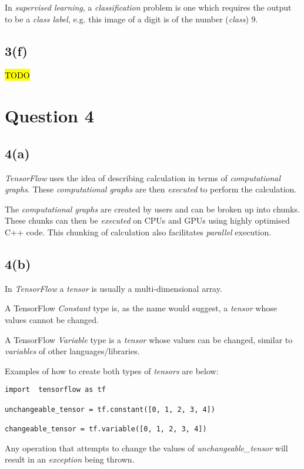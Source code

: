 \documentclass[12pt, a4paper,reqno]{article}
\begin{document}
In \emph{supervised learning}, a \emph{classification} problem is one which requires the output to be a \emph{class label}, e.g. this image of a digit is of the number (\emph{class}) 9.

\subsection*{3(f)}
\hl{TODO}


%
%
\clearpage\section*{Question 4}

\subsection*{4(a)}
\emph{TensorFlow} uses the idea of describing calculation in terms of \emph{computational graphs}. These \emph{computational graphs} are then \emph{executed} to perform the calculation. 

The \emph{computational graphs} are created by users and can be broken up into chunks. These chunks can then be \emph{executed} on CPUs and GPUs using highly optimised C++ code. This chunking of calculation also facilitates \emph{parallel} execution. 

\subsection*{4(b)}
In \emph{TensorFlow} a \emph{tensor} is usually a multi-dimensional array.

A TensorFlow \emph{Constant} type is, as the name would suggest, a \emph{tensor} whose values cannot be changed.

A TensorFlow \emph{Variable} type is a \emph{tensor} whose values can be changed, similar to \emph{variables} of other languages/libraries.

Examples of how to create both types of \emph{tensors} are below:

\begin{verbatim}
import  tensorflow as tf

unchangeable_tensor = tf.constant([0, 1, 2, 3, 4])

changeable_tensor = tf.variable([0, 1, 2, 3, 4])
\end{verbatim}

Any operation that attempts to change the values of \emph{unchangeable\_tensor} will result in an \emph{exception} being thrown.
\end{document}
